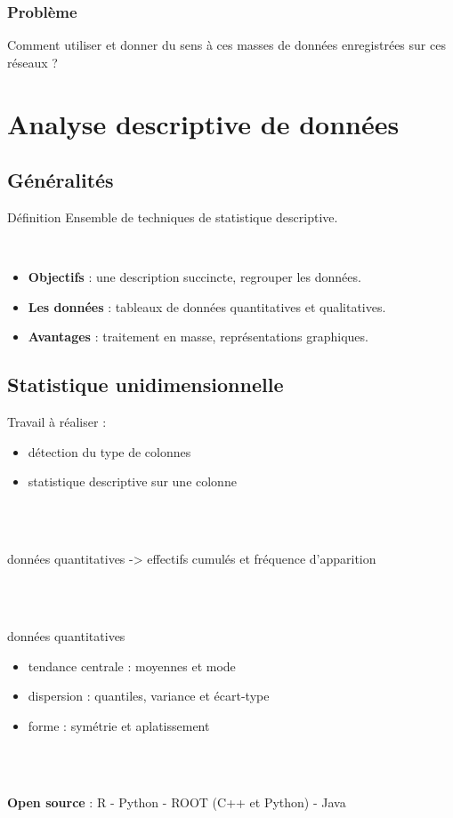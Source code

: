 	\begin{frame}
	\frametitle{Problème}
		Comment utiliser et donner du sens à ces masses de données enregistrées sur ces réseaux ?
	\end{frame}
	
	\section{Analyse descriptive de données}
	\subsection{Généralités}
	\begin{frame}
		\begin{block}{Définition}
		Ensemble de techniques de statistique descriptive.
		\end{block}
		~\\
		\begin{itemize}
		\pause\item \textbf{Objectifs} : une description succincte, regrouper les données.
		\pause\item \textbf{Les données} : tableaux de données quantitatives et qualitatives.
		\pause\item \textbf{Avantages} : traitement en masse, représentations graphiques.
		\end{itemize}
	\end{frame}
	
	\subsection{Statistique unidimensionnelle}
	\begin{frame}
		Travail à réaliser :
		\begin{itemize}
		\item détection du type de colonnes 
		\item statistique descriptive sur une colonne
		\end{itemize}
		
		\\~\\
		\pause
		
		données quantitatives -> effectifs cumulés et fréquence d'apparition
		
		\\~\\
		\pause
		
		données quantitatives
		\begin{itemize}
		\item tendance centrale : moyennes et mode
		\item dispersion : quantiles, variance et écart-type
		\item forme : symétrie et aplatissement
		\end{itemize}
		
		\\~\\
		\pause
		
		\textbf{Open source} : R - Python - ROOT (C++ et Python) - Java
		
	\end{frame}
	
